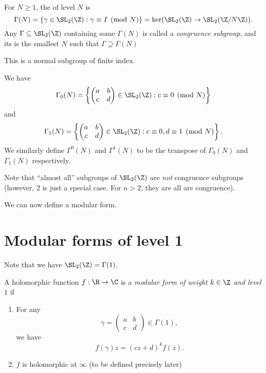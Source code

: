 \documentclass[a4paper]{article}
\begin{document}
\begin{defi}
  For $N \geq 1$, the  of level $N$ is
  \[
    \Gamma(N) = \{\gamma \in \SL_2(\Z) : \gamma \equiv I \pmod N\} = \ker (\SL_2(\Z) \to \SL_2(\Z/N\Z)).
  \]
  Any $\Gamma \subseteq \SL_2(\Z)$ containing some $\Gamma(N)$ is called a \emph{congruence subgroup}, and its  is the smallest $N$ such that $\Gamma \supseteq \Gamma(N)$
\end{defi}
This is a normal subgroup of finite index.
\begin{eg}
  We have
  \[
    \Gamma_0(N) =\left\{
      \begin{pmatrix}
        a & b\\
        c & d
      \end{pmatrix}
    \in \SL_2(\Z): c \equiv 0\pmod N\right\}
  \]
  and 
  \[
    \Gamma_1(N) =\left\{
      \begin{pmatrix}
        a & b\\
        c & d
      \end{pmatrix}
    \in \SL_2(\Z): c \equiv 0, d\equiv 1 \pmod N\right\}.
  \]
  We similarly define $\Gamma^0(N)$ and $\Gamma^1(N)$ to be the transpose of $\Gamma_0(N)$ and $\Gamma_1(N)$ respectively.
\end{eg}
Note that ``almost all'' subgroups of $\SL_2(\Z)$ are \emph{not} congruence subgroups (however, $2$ is just a special case. For $n> 2$, they are all are congruence).

We can now define a modular form.
\section{Modular forms of level 1}
Note that we have $\SL_2(\Z) = \Gamma(1)$.
\begin{defi}
  A holomorphic function $f: \H \to \C$ is a \emph{modular form of weight $k \in \Z$ and level $1$} if
  \begin{enumerate}
    \item For any
      \[
        \gamma =
        \begin{pmatrix}
          a & b\\
          c & d
        \end{pmatrix} \in \Gamma(1),
      \]
      we have
      \[
        f(\gamma)z = (cz + d)^k f(z).
      \]
    \item $f$ is holomorphic at $\infty$ (to be defined precisely later)
  \end{enumerate}
\end{defi}
\end{document}
